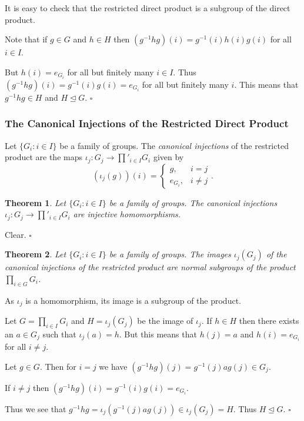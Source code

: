 \documentclass[10pt]{article}
\newtheorem{theorem}{Theorem}[section]
\newenvironment{proof}[1][Proof]{\begin{trivlist}
\item[\hskip \labelsep {\itshape #1}]}{\end{trivlist}}
\newenvironment{definition}[1][Definition]{\begin{trivlist}
\item[\hskip \labelsep {\bfseries #1}]}{\end{trivlist}}
\begin{document}
\begin{proof}
It is easy to check that the restricted direct product is a subgroup of the direct product.

Note that if $g \in G$ and $h \in H$ then $(g^{-1}hg)(i) = g^{-1}(i)h(i)g(i)$ for all $i \in I$.

But $h(i) = e_{G_i}$ for all but finitely many $i \in I$. Thus $(g^{-1}hg)(i) = g^{-1}(i)g(i) = e_{G_i}$ for all but finitely many $i$. This means that $g^{-1}hg \in H$ and $H \mathrel{\unlhd} G$. $\square$
\end{proof}

\subsubsection{The Canonical Injections of the Restricted Direct Product}

\begin{definition}
Let $\{G_i : i \in I\}$ be a family of groups. The \emph{canonical injections} of the restricted product are the maps $\iota_j : G_j \to \prod'_{i \in I} G_i$ given by
$$(\iota_j(g))(i) = \begin{cases}g, & i = j\\e_{G_i}, & i \neq j\end{cases}.$$
\end{definition}

\begin{theorem}
Let $\{G_i : i \in I\}$ be a family of groups. The canonical injections $\iota_j : G_j \to \prod'_{i\in I} G_i$ are injective homomorphisms.
\end{theorem}

\begin{proof}
Clear. $\square$
\end{proof}

\begin{theorem}
Let $\{G_i : i \in I\}$ be a family of groups. The images $\iota_j(G_j)$ of the canonical injections of the restricted product are normal subgroups of the product $\prod_{i\in G} G_i$.
\end{theorem}

\begin{proof}
As $\iota_j$ is a homomorphism, its image is a subgroup of the product.

Let $G = \prod_{i \in I} G_i$ and $H = \iota_j(G_j)$ be the image of $\iota_j$. If $h \in H$ then there exists an $a \in G_j$ such that $\iota_j(a) = h$. But this means that $h(j) = a$ and $h(i) = e_{G_i}$ for all $i \neq j$.

Let $g \in G$. Then for $i = j$ we have $(g^{-1}hg)(j) = g^{-1}(j)ag(j) \in G_j$.

If $i \neq j$ then $(g^{-1}hg)(i) = g^{-1}(i)g(i) = e_{G_i}$.

Thus we see that $g^{-1}hg = \iota_j(g^{-1}(j)ag(j)) \in \iota_j(G_j) = H$. Thus $H \mathrel{\unlhd} G$. $\square$
\end{proof}
\end{document}
